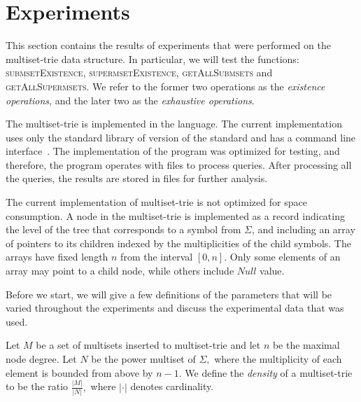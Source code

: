\section{Experiments} \label{c:experiments}

%
This section contains the results of experiments that were performed on the multiset-trie 
data structure. In particular, we will test the functions: \textsc{submsetExistence}, 
\textsc{supermsetExistence}, \textsc{getAllSubmsets} and \textsc{getAllSupermsets}. We refer
to the former two operations as the \emph{existence operations}, and the later two as the
  \emph{exhaustive operations}.

The multiset-trie is implemented in the  language. 
The current implementation uses only the standard library of  version of the 
standard and has a command line interface~\cite{akulich2019mstrie}. The implementation of the program was 
optimized for testing, and therefore, the program operates with files to 
process queries. After processing all the queries, the results are stored in files for further analysis.

The current implementation of multiset-trie is not optimized for space consumption.
A node in the multiset-trie is implemented as a record indicating the level of the tree
that corresponds to a symbol from $\Sigma$, and including an array of pointers to
its children indexed by the multiplicities of the child symbols. The arrays have
fixed length $n$ from the interval $[0,n].$
Only some elements of an array may point to a child node, while others include
$Null$ value.


Before we start, we will give a few definitions of the parameters 
that will be varied throughout the experiments and discuss the experimental data 
that was used.

Let $M$ be a set of multisets inserted to multiset-trie and let $n$ be 
the maximal node degree. Let $N$ be the power multiset of $\Sigma,$ where 
the multiplicity of each element is bounded from above by $n-1.$ We define the 
\emph{density} of a multiset-trie to be the ratio $\frac{|M|}{|N|},$ where 
$|\cdot|$ denotes cardinality.

